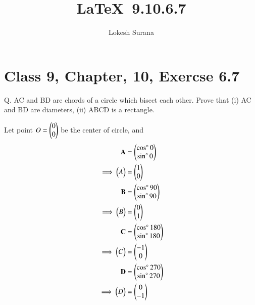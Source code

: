 \documentclass[journal,12pt,twocolumn]{IEEEtran}
\let\vec\mathbf
\begin{document}
\vspace{3cm}
\title{\LaTeX\ 9.10.6.7}
\author{Lokesh Surana}
\maketitle
\section*{Class 9, Chapter, 10, Exercse 6.7}

Q. AC and BD are chords of a circle which bisect each other. Prove that (i) AC and BD are diameters, (ii) ABCD is a rectangle.

\solution
Let point $O = \begin{pmatrix}0\\0\end{pmatrix}$ be the center of circle, and 
\begin{align}
    \vec{A} &= \myvec{\cos\degree0 \\ \sin\degree0} \\
    \implies \myvec{A} &= \myvec{1 \\ 0} \\
    \vec{B} &= \myvec{\cos\degree90 \\ \sin\degree90} \\
    \implies \myvec{B} &= \myvec{0 \\ 1} \\
    \vec{C} &= \myvec{\cos\degree180 \\ \sin\degree180} \\
    \implies \myvec{C} &= \myvec{-1 \\ 0} \\
    \vec{D} &= \myvec{\cos\degree270 \\ \sin\degree270} \\
    \implies \myvec{D} &= \myvec{0 \\ -1}
\end{align}
\end{document}
